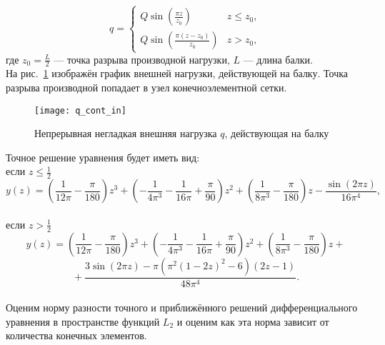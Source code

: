 \documentclass[12pt,a4paper]{article}
\begin{document}
\[
q = 
 \begin{cases}
   Q \sin \left(\frac{\pi  z}{z_{0}}\right) & z \leq z_{0}, \\
   Q \sin \left(\frac{\pi  (z-z_{0})}{z_{0}}\right) & z > z_{0},
 \end{cases}
\]
где $z_{0}=\frac{L}{2}$ --- точка разрыва производной нагрузки, $L$ --- длина балки. \\

На рис.~\ref{fig:q_cont_in} изображён график внешней нагрузки, действующей на балку. Точка разрыва производной попадает в узел конечноэлементной сетки.
	\begin{figure}[H]
		\centering
		\texttt{[image: q\_cont\_in]}
		\caption{Непрерывная негладкая внешняя нагрузка $q$, действующая на балку}
		\label{fig:q_cont_in}
	\end{figure}

%

Точное решение уравнения будет иметь вид:\\
если $z \leq \frac{1}{2}$\\
$$y(z)= \left(\frac{1}{12 \pi }-\frac{\pi }{180}\right) z^3+\left(-\frac{1}{4 \pi ^3}-\frac{1}{16 \pi }+\frac{\pi }{90}\right) z^2+\left(\frac{1}{8 \pi ^3}-\frac{\pi }{180}\right) z -\frac{\sin (2 \pi  z)}{16 \pi ^4},$$\\
если $z > \frac{1}{2}$\\
$$y(z)= \left(\frac{1}{12 \pi }-\frac{\pi }{180}\right) z^3+\left(-\frac{1}{4 \pi ^3}-\frac{1}{16 \pi }+\frac{\pi }{90}\right) z^2+\left(\frac{1}{8 \pi ^3}-\frac{\pi }{180}\right) z +{}$$
$${} + \frac{3 \sin (2 \pi  z)-\pi  \left(\pi ^2 (1-2 z)^2-6\right) (2 z-1)}{48 \pi ^4}.$$ \\


Оценим норму разности точного и приближённого решений дифференциального уравнения в пространстве функций $L_{2}$  и оценим как эта норма зависит от количества конечных элементов.\\
\end{document}
